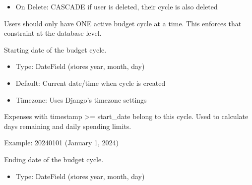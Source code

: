 \documentclass[letterpaper,10pt,english]{sphinxmanual}
\begin{document}
\begin{fulllineitems}
\begin{fulllineitems}
\begin{description}
\begin{itemize}
\item {} 
\sphinxAtStartPar
On Delete: CASCADE \sphinxhyphen{} if user is deleted, their cycle is also deleted

\end{itemize}

\sphinxAtStartPar
Users should only have ONE active budget cycle at a time.
This enforces that constraint at the database level.

\end{description}

\end{fulllineitems}


\begin{fulllineitems}
\label{\detokenize{expensesApp:id6}}
\pysigstartsignatures
\pysigline
{}
\pysigstopsignatures
\sphinxAtStartPar
Starting date of the budget cycle.
\begin{description}
\begin{itemize}
\item {} 
\sphinxAtStartPar
Type: DateField (stores year, month, day)

\item {} 
\sphinxAtStartPar
Default: Current date/time when cycle is created

\item {} 
\sphinxAtStartPar
Timezone: Uses Django’s timezone settings

\end{itemize}

\sphinxAtStartPar
Expenses with timestamp \textgreater{}= start\_date belong to this cycle.
Used to calculate days remaining and daily spending limits.

\end{description}

\sphinxAtStartPar
Example: 2024\sphinxhyphen{}01\sphinxhyphen{}01 (January 1, 2024)

\end{fulllineitems}


\begin{fulllineitems}
\label{\detokenize{expensesApp:id7}}
\pysigstartsignatures
\pysigline
{}
\pysigstopsignatures
\sphinxAtStartPar
Ending date of the budget cycle.
\begin{description}
\begin{itemize}
\item {} 
\sphinxAtStartPar
Type: DateField (stores year, month, day)


\end{itemize}
\end{description}
\end{fulllineitems}
\end{fulllineitems}
\end{document}
